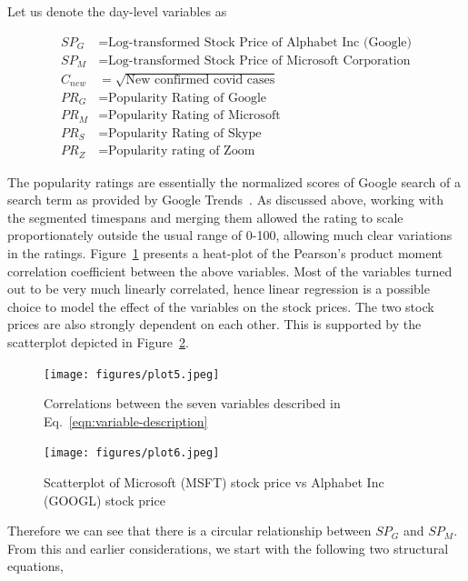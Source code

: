 \documentclass[11pt, a4paper]{article}
\begin{document}
\noindent Let us denote the day-level variables as

\begin{equation}
    \begin{split}
        SP_{G} & = \text{Log-transformed Stock Price of Alphabet Inc (Google)}\\
        SP_{M} & = \text{Log-transformed Stock Price of Microsoft Corporation}\\
        C_{new} & = \sqrt{\text{New confirmed covid cases}}\\
        PR_{G} & = \text{Popularity Rating of Google}\\
        PR_{M} & = \text{Popularity Rating of Microsoft}\\
        PR_{S} & = \text{Popularity Rating of Skype}\\
        PR_{Z} & = \text{Popularity rating of Zoom}
    \end{split}
    \label{eqn:variable-description}
\end{equation}

The popularity ratings are essentially the normalized scores of Google search of a search term as provided by Google Trends~\cite{google-trends}. As discussed above, working with the segmented timespans and merging them allowed the rating to scale proportionately outside the usual range of 0-100, allowing much clear variations in the ratings. Figure~\ref{fig:corr} presents a heat-plot of the Pearson's product moment correlation coefficient between the above variables. Most of the variables turned out to be very much linearly correlated, hence linear regression is a possible choice to model the effect of the variables on the stock prices. The two stock prices are also strongly dependent on each other. This is supported by the scatterplot depicted in Figure~\ref{fig:GvsM}.

\begin{figure}[ht]
    \centering
    \texttt{[image: figures/plot5.jpeg]}
    \caption{Correlations between the seven variables described in Eq.~\eqref{eqn:variable-description}}
    \label{fig:corr}
\end{figure} 

\begin{figure}[ht]
    \centering
    \texttt{[image: figures/plot6.jpeg]}
    \caption{Scatterplot of Microsoft (MSFT) stock price vs Alphabet Inc (GOOGL) stock price}
    \label{fig:GvsM}
\end{figure}


\noindent Therefore we can see that there is a circular relationship between $SP_{G}$ and $SP_{M}$. From this and earlier considerations, we start with the following two structural equations,
\end{document}
